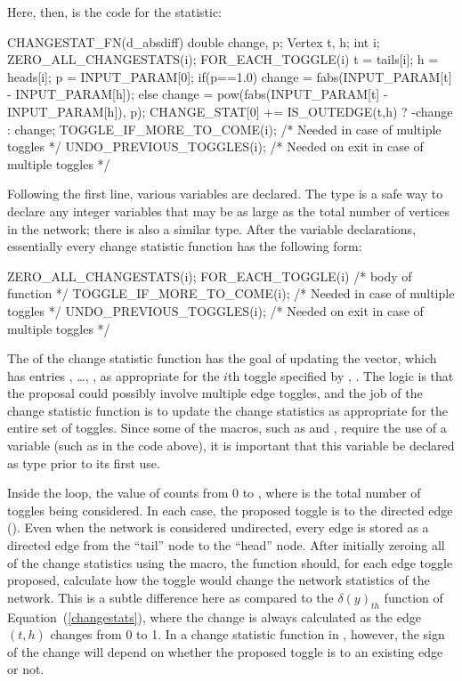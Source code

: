 \documentclass[nojss]{jss}
\begin{document}
Here, then, is the code for the  statistic:
\begin{CodeChunk}
\begin{CodeInput}
CHANGESTAT_FN(d_absdiff) {
  double change, p; Vertex t, h; int i;
  ZERO_ALL_CHANGESTATS(i);
  FOR_EACH_TOGGLE(i) {
    t = tails[i]; h = heads[i];
    p = INPUT_PARAM[0];
    if(p==1.0){
      change = fabs(INPUT_PARAM[t] - INPUT_PARAM[h]);
    }else{
      change = pow(fabs(INPUT_PARAM[t] - INPUT_PARAM[h]), p);
    }
    CHANGE_STAT[0] += IS_OUTEDGE(t,h) ? -change : change;
    TOGGLE_IF_MORE_TO_COME(i); /* Needed in case of multiple toggles */
  }
  UNDO_PREVIOUS_TOGGLES(i); /* Needed on exit in case of multiple toggles */
}
\end{CodeInput}
\end{CodeChunk}
Following the first line, various variables are declared.  The  type
is a safe way to declare any integer variables that may be as large as the total number of
vertices in the network; there is also a similar  type.
After the variable declarations, essentially every change statistic function has the following
form:
\begin{CodeChunk}
\begin{CodeInput}
  ZERO_ALL_CHANGESTATS(i);
  FOR_EACH_TOGGLE(i) {
    /* body of function */
    TOGGLE_IF_MORE_TO_COME(i); /* Needed in case of multiple toggles */
  }
  UNDO_PREVIOUS_TOGGLES(i); /* Needed on exit in case of multiple toggles */
\end{CodeInput}
\end{CodeChunk}
The  of the change statistic function has the goal of
updating the  vector, which has entries
, \ldots,
,
as appropriate for the $i$th toggle specified by
, .  The logic is that the proposal could possibly involve
multiple edge toggles, and the job of the change statistic function is to update the
change statistics as appropriate for the entire set of toggles.
Since some of the macros, such as  and
,
 require the use of a variable (such as  in the code above), it is important
 that this variable be declared as type  prior to its first use.

Inside the  loop, the value of 
counts from 0 to , where  is the total number of
toggles being considered.  In each case, the proposed toggle is to the
directed edge ().  Even when the network is considered undirected,
every edge is stored as a directed edge from the ``tail'' node to the ``head'' node.
After initially zeroing all of the change statistics using the
 macro, the function should, for each edge
toggle proposed, calculate how the toggle would change the network statistics of the
network.  This is a subtle difference here as compared to  the $\delta(y)_{th}$ function of
Equation~(\ref{changestats}), where the change is always calculated as the edge $(t,h)$
changes from 0 to 1.  In a change statistic function in , however, the sign of the
change will depend on whether the proposed toggle is to an existing edge or not.
\end{document}

